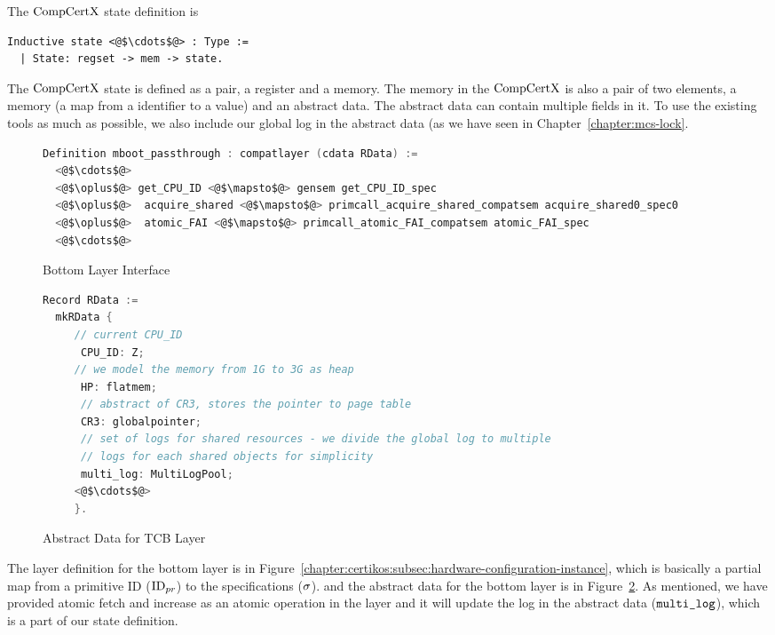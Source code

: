 
The $\mathrm{CompCertX}$ state definition is
\begin{lstlisting}
Inductive state <@$\cdots$@> : Type :=
  | State: regset -> mem -> state.
\end{lstlisting}
The $\mathrm{CompCertX}$ state is defined as a pair, 
a register and a memory. 
The memory in the $\mathrm{CompCertX}$ is also a pair of two elements, 
a memory (a map from a identifier to a value) and an abstract data. 
The abstract data can contain 
multiple fields in it. 
To use the existing tools as much as possible, 
we also include our global log in the abstract data (as we have seen in Chapter~\ref{chapter:mcs-lock}.

\begin{figure}
\begin{lstlisting}[language=C]
Definition mboot_passthrough : compatlayer (cdata RData) :=
  <@$\cdots$@>
  <@$\oplus$@> get_CPU_ID <@$\mapsto$@> gensem get_CPU_ID_spec
  <@$\oplus$@>  acquire_shared <@$\mapsto$@> primcall_acquire_shared_compatsem acquire_shared0_spec0
  <@$\oplus$@>  atomic_FAI <@$\mapsto$@> primcall_atomic_FAI_compatsem atomic_FAI_spec
  <@$\cdots$@>
\end{lstlisting}
\caption{Bottom Layer Interface}
\label{fig:chapter:certikos:bottom-layer-interface}
\end{figure}

\begin{figure}
\begin{lstlisting}[language=C]
Record RData :=
  mkRData {
     // current CPU_ID
      CPU_ID: Z;
     // we model the memory from 1G to 3G as heap            
      HP: flatmem;     
      // abstract of CR3, stores the pointer to page table
      CR3: globalpointer;
      // set of logs for shared resources - we divide the global log to multiple
      // logs for each shared objects for simplicity   
      multi_log: MultiLogPool;     
     <@$\cdots$@>
     }.
\end{lstlisting}
\caption{Abstract Data for TCB Layer}
\label{fig:chapter:certikos:abstract-data-for-bottom-layer}
\end{figure}

The layer definition for the bottom layer is in Figure~\ref{chapter:certikos:subsec:hardware-configuration-instance},
which is basically a partial map from a primitive ID (${\mathrm{ID}_{pr}}$) to the specifications ($\sigma$).
and the abstract data for the bottom layer is in Figure~\ref{fig:chapter:certikos:abstract-data-for-bottom-layer}.
As mentioned, 
we have provided atomic fetch and increase as an atomic operation in the layer 
and it will update the log in the abstract data (${\mathrm{\texttt{multi\_log}}}$), which is 
a part of our state definition. 

